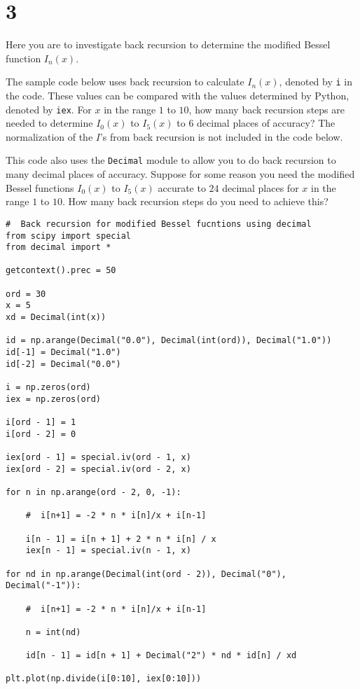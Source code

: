 \section{3}

Here you are to investigate back recursion to determine the modified Bessel function
$I_n(x)$.

The sample code below uses back recursion to calculate $I_n(x)$, denoted by \texttt{i} in
the code. These values can be compared with the values determined by Python, denoted by
\texttt{iex}. For $x$ in the range $1$ to $10$, how many back recursion steps are needed to
determine $I_0(x)$ to $I_5(x)$ to $6$ decimal places of accuracy? The normalization of the
$I$'s from back recursion is not included in the code below.

This code also uses the \texttt{Decimal} module to allow you to do back recursion to many
decimal places of accuracy. Suppose for some reason you need the modified Bessel functions
$I_0(x)$ to $I_5(x)$ accurate to $24$ decimal places for $x$ in the range $1$ to $10$.  How
many back recursion steps do you need to achieve this?

\begin{verbatim}
#  Back recursion for modified Bessel fucntions using decimal
from scipy import special
from decimal import *

getcontext().prec = 50

ord = 30
x = 5
xd = Decimal(int(x))

id = np.arange(Decimal("0.0"), Decimal(int(ord)), Decimal("1.0"))
id[-1] = Decimal("1.0")
id[-2] = Decimal("0.0")

i = np.zeros(ord)
iex = np.zeros(ord)

i[ord - 1] = 1
i[ord - 2] = 0

iex[ord - 1] = special.iv(ord - 1, x)
iex[ord - 2] = special.iv(ord - 2, x)

for n in np.arange(ord - 2, 0, -1):

    #  i[n+1] = -2 * n * i[n]/x + i[n-1]

    i[n - 1] = i[n + 1] + 2 * n * i[n] / x
    iex[n - 1] = special.iv(n - 1, x)

for nd in np.arange(Decimal(int(ord - 2)), Decimal("0"), Decimal("-1")):

    #  i[n+1] = -2 * n * i[n]/x + i[n-1]

    n = int(nd)

    id[n - 1] = id[n + 1] + Decimal("2") * nd * id[n] / xd

plt.plot(np.divide(i[0:10], iex[0:10]))
\end{verbatim}
